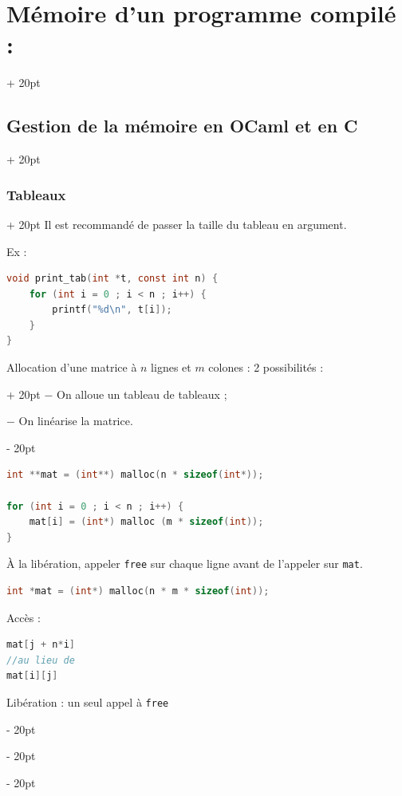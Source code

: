 \documentclass[a4paper, 12pt, twoside]{article}
\newcommand{\ind}[1][20pt]{\advance\leftskip + #1}
\newcommand{\deind}[1][20pt]{\advance\leftskip - #1}
\newenvironment{indentedenv}[1][20pt]{\par \ind[#1]}{\par \deind}
\newenvironment{indt}[2][20pt]{#2 \begin{indentedenv}[#1]}{\end{indentedenv}} %
\begin{document}
\begin{indt}{\section{Mémoire d'un programme compilé :}}
\begin{indt}{\subsection{Gestion de la mémoire en OCaml et en C}}
\begin{indt}{\subsubsection{Tableaux}}
                Il est recommandé de passer la taille du tableau en argument.
                
                Ex :
                \begin{lstlisting}[language=C, xleftmargin=80pt]
void print_tab(int *t, const int n) {
    for (int i = 0 ; i < n ; i++) {
        printf("%d\n", t[i]);
    }
}\end{lstlisting}
                \vspace{6pt}
                \begin{indt}{Allocation d'une matrice à $n$ lignes et $m$ colones : 2 possibilités :}
                    $-$ On alloue un tableau de tableaux ;
                    
                    $-$ On linéarise la matrice.
                \end{indt}
                
                \vspace{12pt}
                
                \begin{lstlisting}[language=C, xleftmargin=80pt]
int **mat = (int**) malloc(n * sizeof(int*));

for (int i = 0 ; i < n ; i++) {
    mat[i] = (int*) malloc (m * sizeof(int));
}\end{lstlisting}
                
                \`A la libération, appeler \texttt{free} sur chaque ligne avant de l'appeler sur \texttt{mat}.
                
                \vspace{12pt}
                
                \begin{lstlisting}[language=C, xleftmargin=80pt]
int *mat = (int*) malloc(n * m * sizeof(int));\end{lstlisting}
                Accès :
                
                \begin{lstlisting}[language=C, xleftmargin=80pt]
mat[j + n*i]
//au lieu de
mat[i][j]\end{lstlisting}
                Libération : un seul appel à \texttt{free}
            \end{indt}
            
            \vspace{6pt}
            

\end{indt}
\end{indt}
\end{document}
